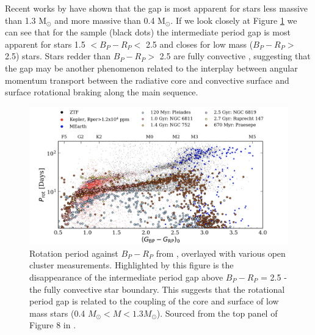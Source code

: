 Recent works by \citet{lu_bridging_2022} have shown that the gap is most apparent for stars less massive than 1.3 M$_{\odot}$ and more massive than 0.4 M$_{\odot}$.
If we look closely at Figure \ref{fig:ztf_comp} we can see that for the \ZTF{} sample (black dots) the intermediate period gap is most apparent for stars 1.5 $<B_P-R_P <$ 2.5 and closes for low mass ($B_P-R_P >$ 2.5) stars.
Stars redder than $B_P-R_P >$ 2.5 are fully convective \citep{amard_first_2019}, suggesting that the gap may be another phenomenon related to the interplay between angular momentum transport between the radiative core and convective surface and surface rotational braking along the main sequence.

\begin{figure}[h]
    \includegraphics[width=\textwidth]{Figures/intro_figures/ztf_comp.png}
    \caption[Rotation period distribution including fully convective stars.]{Rotation period against \gaia{} $B_P - R_P$ from \kepler{}, \ZTF{} overlayed with various open cluster measurements. Highlighted by this figure is the disappearance of the intermediate period gap above $B_P-R_P$ = 2.5 - the fully convective star boundary. This suggests that the rotational period gap is related to the coupling of the core and surface of low mass stars (0.4 $M_{\odot} <M< 1.3M_{\odot}$). Sourced from the top panel of Figure 8 in \citep{lu_bridging_2022}.}
    \label{fig:ztf_comp}
\end{figure}

